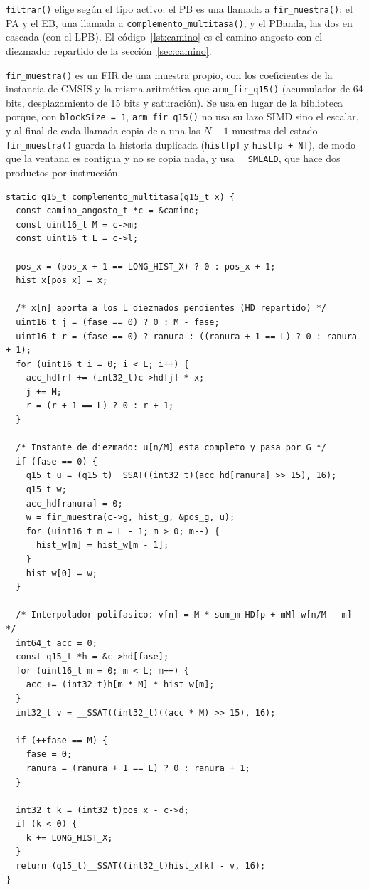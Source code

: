 \documentclass[11pt,a4paper]{article}
\begin{document}
\texttt{filtrar()} elige según el tipo activo: el PB es una llamada a
\texttt{fir\_muestra()}; el PA y el EB, una llamada a
\texttt{complemento\_multitasa()}; y el PBanda, las dos en cascada (con el
LPB). El código~\ref{lst:camino} es el camino angosto con el diezmador
repartido de la sección~\ref{sec:camino}.

\texttt{fir\_muestra()} es un FIR de una muestra propio, con los
coeficientes de la instancia de CMSIS y la misma aritmética que
\texttt{arm\_fir\_q15()} (acumulador de 64 bits, desplazamiento de 15 bits y
saturación). Se usa en lugar de la biblioteca porque, con
\texttt{blockSize = 1}, \texttt{arm\_fir\_q15()} no usa su lazo SIMD sino el
escalar, y al final de cada llamada copia de a una las $N-1$ muestras del
estado. \texttt{fir\_muestra()} guarda la historia duplicada
(\texttt{hist[p]} y \texttt{hist[p + N]}), de modo que la ventana es
contigua y no se copia nada, y usa \texttt{\_\_SMLALD}, que hace dos
productos por instrucción.

\begin{lstlisting}[caption={Camino angosto: \texttt{complemento\_multitasa()} (\texttt{source/TP2.c}).},label={lst:camino}]
static q15_t complemento_multitasa(q15_t x) {
  const camino_angosto_t *c = &camino;
  const uint16_t M = c->m;
  const uint16_t L = c->l;

  pos_x = (pos_x + 1 == LONG_HIST_X) ? 0 : pos_x + 1;
  hist_x[pos_x] = x;

  /* x[n] aporta a los L diezmados pendientes (HD repartido) */
  uint16_t j = (fase == 0) ? 0 : M - fase;
  uint16_t r = (fase == 0) ? ranura : ((ranura + 1 == L) ? 0 : ranura + 1);
  for (uint16_t i = 0; i < L; i++) {
    acc_hd[r] += (int32_t)c->hd[j] * x;
    j += M;
    r = (r + 1 == L) ? 0 : r + 1;
  }

  /* Instante de diezmado: u[n/M] esta completo y pasa por G */
  if (fase == 0) {
    q15_t u = (q15_t)__SSAT((int32_t)(acc_hd[ranura] >> 15), 16);
    q15_t w;
    acc_hd[ranura] = 0;
    w = fir_muestra(c->g, hist_g, &pos_g, u);
    for (uint16_t m = L - 1; m > 0; m--) {
      hist_w[m] = hist_w[m - 1];
    }
    hist_w[0] = w;
  }

  /* Interpolador polifasico: v[n] = M * sum_m HD[p + mM] w[n/M - m] */
  int64_t acc = 0;
  const q15_t *h = &c->hd[fase];
  for (uint16_t m = 0; m < L; m++) {
    acc += (int32_t)h[m * M] * hist_w[m];
  }
  int32_t v = __SSAT((int32_t)((acc * M) >> 15), 16);

  if (++fase == M) {
    fase = 0;
    ranura = (ranura + 1 == L) ? 0 : ranura + 1;
  }

  int32_t k = (int32_t)pos_x - c->d;
  if (k < 0) {
    k += LONG_HIST_X;
  }
  return (q15_t)__SSAT((int32_t)hist_x[k] - v, 16);
}
\end{lstlisting}
\end{document}
